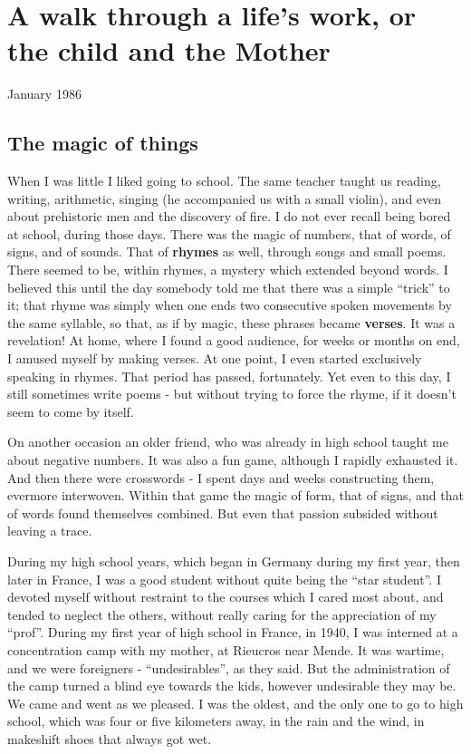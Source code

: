 \begin{comment}
\documentclass{book}
\usepackage{master}
\newcommand{\rec}{$\text{R\'ecoltes et Semailles}$}
\newcommand{\no}{n$^\circ$}
\hfuzz = 100pt

\setcounter{chapter}{1}
\end{comment}

\chapter{A walk through a life's work, or the child and the Mother}

January 1986

\section{The magic of things}

When I was little I liked going to school. The same teacher taught us reading,
writing, arithmetic, singing (he accompanied us with a small violin), and even
about prehistoric men and the discovery of fire.
I do not ever recall being bored at school, during those days.
There was the magic of numbers, that of words, of signs, and of sounds.
That of \textbf{rhymes} as well, through songs and small poems. 
There seemed to be, within rhymes, a mystery which extended beyond words.
I believed this until the day somebody told me that there was a simple ``trick'' to it;
that rhyme was simply when one ends
two consecutive spoken movements by the same syllable, so that, as if by magic, these
phrases became \textbf{verses}. It was a revelation! 
At home, where I found a good audience, for weeks or months on end, I amused myself by
making verses. At one point, I even started exclusively speaking in rhymes. 
That period has passed, fortunately. 
Yet even to this day, I still sometimes write poems - but without trying to force the
rhyme, if it doesn't seem to come by itself. 

On another occasion an older friend, who was already in high school taught me about
negative numbers. It was also a fun game, although I rapidly exhausted it. 
And then there were crosswords - I spent days and weeks constructing them, evermore
interwoven. Within that game the magic of form, that of signs, and that of words found
themselves combined. But even that passion subsided without leaving a trace. 

During my high school years, which began in Germany during my first year, then later in
France, I was a good student without quite being the ``star student''.
I devoted myself without restraint to the
courses which I cared most about, and tended to neglect the others, without really caring
for the appreciation of my ``prof''. 
During my first year of high school in France, in 1940, I was interned at a concentration
camp with my mother, at Rieucros near Mende. It was wartime, and we were foreigners -
``undesirables'', as they said. But the administration of the camp turned a blind eye
towards the kids, however undesirable they may be. We came and went as we pleased. 
I was the oldest, and the only one to go to high school, which was four or five kilometers
away, in the rain and the wind, in makeshift shoes 
that always got wet. 

